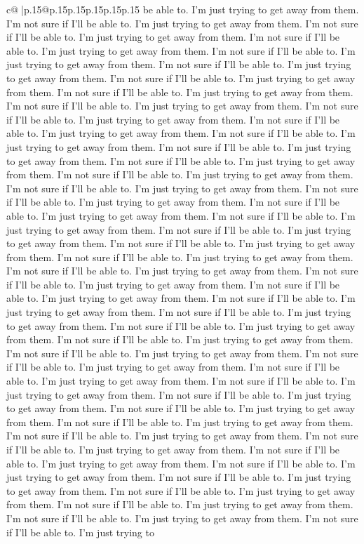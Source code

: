 \documentclass{article}
\begin{document}
{\begin{supertabular}{c@{$\;$}|p{.15\linewidth}@{}p{.15\linewidth}p{.15\linewidth}p{.15\linewidth}p{.15\linewidth}p{.15\linewidth}}
{{{be able to. I'm just trying to get away from them. I'm not sure if I'll be able to. I'm just trying to get away from them. I'm not sure if I'll be able to. I'm just trying to get away from them. I'm not sure if I'll be able to. I'm just trying to get away from them. I'm not sure if I'll be able to. I'm just trying to get away from them. I'm not sure if I'll be able to. I'm just trying to get away from them. I'm not sure if I'll be able to. I'm just trying to get away from them. I'm not sure if I'll be able to. I'm just trying to get away from them. I'm not sure if I'll be able to. I'm just trying to get away from them. I'm not sure if I'll be able to. I'm just trying to get away from them. I'm not sure if I'll be able to. I'm just trying to get away from them. I'm not sure if I'll be able to. I'm just trying to get away from them. I'm not sure if I'll be able to. I'm just trying to get away from them. I'm not sure if I'll be able to. I'm just trying to get away from them. I'm not sure if I'll be able to. I'm just trying to get away from them. I'm not sure if I'll be able to. I'm just trying to get away from them. I'm not sure if I'll be able to. I'm just trying to get away from them. I'm not sure if I'll be able to. I'm just trying to get away from them. I'm not sure if I'll be able to. I'm just trying to get away from them. I'm not sure if I'll be able to. I'm just trying to get away from them. I'm not sure if I'll be able to. I'm just trying to get away from them. I'm not sure if I'll be able to. I'm just trying to get away from them. I'm not sure if I'll be able to. I'm just trying to get away from them. I'm not sure if I'll be able to. I'm just trying to get away from them. I'm not sure if I'll be able to. I'm just trying to get away from them. I'm not sure if I'll be able to. I'm just trying to get away from them. I'm not sure if I'll be able to. I'm just trying to get away from them. I'm not sure if I'll be able to. I'm just trying to get away from them. I'm not sure if I'll be able to. I'm just trying to get away from them. I'm not sure if I'll be able to. I'm just trying to get away from them. I'm not sure if I'll be able to. I'm just trying to get away from them. I'm not sure if I'll be able to. I'm just trying to get away from them. I'm not sure if I'll be able to. I'm just trying to get away from them. I'm not sure if I'll be able to. I'm just trying to get away from them. I'm not sure if I'll be able to. I'm just trying to get away from them. I'm not sure if I'll be able to. I'm just trying to get away from them. I'm not sure if I'll be able to. I'm just trying to get away from them. I'm not sure if I'll be able to. I'm just trying to get away from them. I'm not sure if I'll be able to. I'm just trying to get away from them. I'm not sure if I'll be able to. I'm just trying to get away from them. I'm not sure if I'll be able to. I'm just trying to get away from them. I'm not sure if I'll be able to. I'm just trying to get away from them. I'm not sure if I'll be able to. I'm just trying to get away from them. I'm not sure if I'll be able to. I'm just trying to get away from them. I'm not sure if I'll be able to. I'm just trying to }}}
\end{supertabular}}
\end{document}
